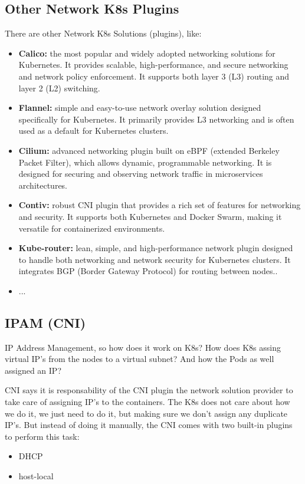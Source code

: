 \documentclass{article}
\begin{document}
\subsection{Other Network K8s Plugins}

There are other Network K8s Solutions (plugins), like:
\begin{itemize}
    \item \textbf{Calico:} the most popular and widely adopted networking solutions for Kubernetes. It provides scalable, high-performance, and secure networking and network policy enforcement. It supports both layer 3 (L3) routing and layer 2 (L2) switching.
    \item \textbf{Flannel:} simple and easy-to-use network overlay solution designed specifically for Kubernetes. It primarily provides L3 networking and is often used as a default for Kubernetes clusters.
    \item \textbf{Cilium:}  advanced networking plugin built on eBPF (extended Berkeley Packet Filter), which allows dynamic, programmable networking. It is designed for securing and observing network traffic in microservices architectures.
    \item \textbf{Contiv:}  robust CNI plugin that provides a rich set of features for networking and security. It supports both Kubernetes and Docker Swarm, making it versatile for containerized environments.
    \item \textbf{Kube-router:} lean, simple, and high-performance network plugin designed to handle both networking and network security for Kubernetes clusters. It integrates BGP (Border Gateway Protocol) for routing between nodes..
    \item ...
\end{itemize}

\subsection{IPAM (CNI)}
IP Address Management, so how does it work on K8s? How does K8s assing virtual IP's from the nodes to a virtual subnet? And how the Pods as well assigned an IP?

CNI says it is responsability of the CNI plugin the network solution provider to take care of assigning IP's to the containers. The K8s does not care about how we do it, we just need to do it, but making sure we don't assign any duplicate IP's. But instead of doing it manually, the CNI comes with two built-in plugins to perform this task:
\begin{itemize}
    \item DHCP
    \item host-local
\end{itemize}
\end{document}

